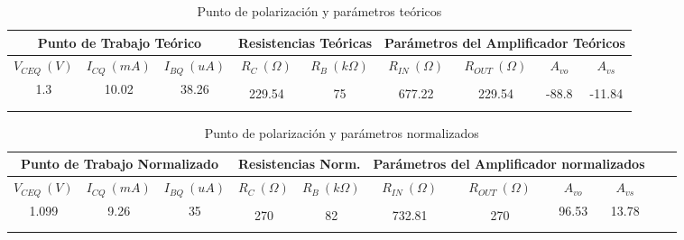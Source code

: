 \documentclass[a4paper, 10pt, spanish]{article}
\numberwithin{equation}{section}
\numberwithin{table}{section}
\begin{document}
\begin{table}[ht]
\begin{center}
\begin{tabular}{|c|c|c|c|c|c|c|c|c|}
    \hline
    \multicolumn{3}{|c|}{Punto de Trabajo Teórico}                             & \multicolumn{2}{|c|}{Resistencias Teóricas} & \multicolumn{4}{|c|}{Parámetros del Amplificador Teóricos}       \\ \hline
    $V_{CEQ}\ (V)$       & $I_{CQ}\ (mA)$        & $I_{BQ}\ (uA)$              & $R_C\ (\Omega)$ & $R_B\ (k\Omega)$          & $R_{IN}\ (\Omega)$ & $R_{OUT}\  (\Omega)$ & $A_{vo}$  & $A_{vs}$ \\ \hline
    \multirow{3}{*}{1.3} & \multirow{3}{*}{10.02}& \multirow{3}{*}{38.26}      &                 &                           &              &                            &           &          \\ 
                         &                       &                             & 229.54          & 75                        &  677.22      &      229.54                &    -88.8  &  -11.84  \\  
                         &                       &                             &                 &                           &              &                            &           &          \\  
    \hline
\end{tabular}
\end{center}
\caption{Punto de polarización y parámetros teóricos}
\label{tab:multicol}
\end{table}


\begin{table}[ht]
\begin{center}
\begin{tabular}{|c|c|c|c|c|c|c|c|c|c|c|}
    \hline
    \multicolumn{3}{|c|}{Punto de Trabajo Normalizado}                      & \multicolumn{2}{|c|}{Resistencias Norm.} & \multicolumn{4}{|c|}{Parámetros del Amplificador normalizados}  \\ \hline
    $V_{CEQ}\ (V)$        & $I_{CQ}\ (mA)$         & $I_{BQ}\ (uA)$         &  $R_C\ (\Omega)$ & $R_B\ (k\Omega)$             & $R_{IN}\ (\Omega)$ & $R_{OUT}\ (\Omega)$ & $A_{vo}$  & $A_{vs}$  \\ \hline
    \multirow{3}{*}{1.099}& \multirow{3}{*}{9.26}  & \multirow{3}{*}{35}   &             &                                    &                    &                     & \multirow{3}{*}{96.53} &\multirow{3}{*}{13.78}  \\
                          &                        &                        &  270       &  82                                & 732.81            &  270                &             &           \\  
                          &                        &                        &            &                                    &                  &                     &              &            \\  
    \hline
\end{tabular}
\end{center}
\caption{Punto de polarización y parámetros normalizados}
\label{tab:multicol}
\end{table}
\end{document}
